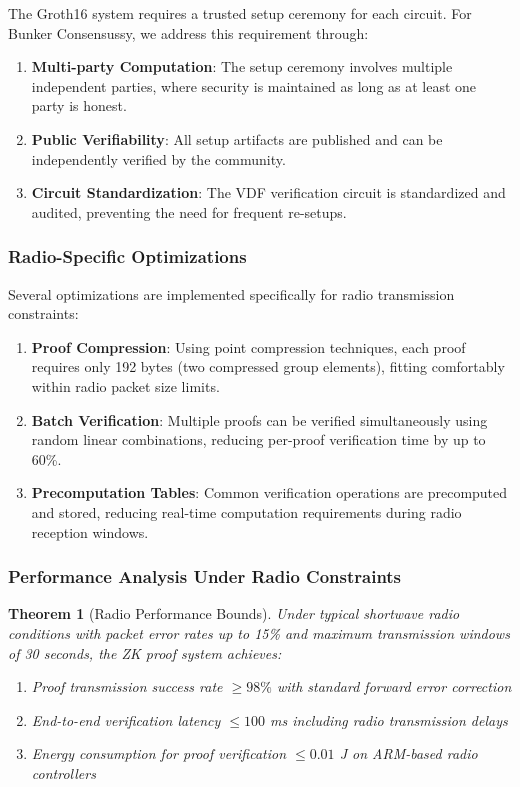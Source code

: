 \documentclass[11pt,a4paper]{article}
\newtheorem{theorem}{Theorem}[section]
\begin{document}
The Groth16 system requires a trusted setup ceremony for each circuit. For Bunker Consensussy, we address this requirement through:

\begin{enumerate}
\item \textbf{Multi-party Computation}: The setup ceremony involves multiple independent parties, where security is maintained as long as at least one party is honest.

\item \textbf{Public Verifiability}: All setup artifacts are published and can be independently verified by the community.

\item \textbf{Circuit Standardization}: The VDF verification circuit is standardized and audited, preventing the need for frequent re-setups.
\end{enumerate}

\subsubsection{Radio-Specific Optimizations}

Several optimizations are implemented specifically for radio transmission constraints:

\begin{enumerate}
\item \textbf{Proof Compression}: Using point compression techniques, each proof requires only 192 bytes (two compressed group elements), fitting comfortably within radio packet size limits.

\item \textbf{Batch Verification}: Multiple proofs can be verified simultaneously using random linear combinations, reducing per-proof verification time by up to 60\%.

\item \textbf{Precomputation Tables}: Common verification operations are precomputed and stored, reducing real-time computation requirements during radio reception windows.
\end{enumerate}

\subsubsection{Performance Analysis Under Radio Constraints}

\begin{theorem}[Radio Performance Bounds]
Under typical shortwave radio conditions with packet error rates up to 15\% and maximum transmission windows of 30 seconds, the ZK proof system achieves:
\begin{enumerate}
\item Proof transmission success rate $\geq 98\%$ with standard forward error correction
\item End-to-end verification latency $\leq 100$ ms including radio transmission delays
\item Energy consumption for proof verification $\leq 0.01$ J on ARM-based radio controllers
\end{enumerate}
\end{theorem}
\end{document}
